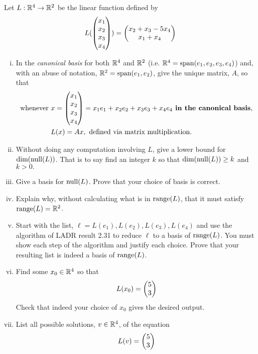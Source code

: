 \begin{question}
    \normalfont
    Let $L:\mathbb R^4\rightarrow\mathbb R^2$ be the linear function defined by
    \begin{equation}
        L(\begin{pmatrix} x_1\\ x_2\\x_3 \\ x_4\end{pmatrix})=\begin{pmatrix} x_2+x_3-5x_4\\ x_1+x_4\end{pmatrix}
    \end{equation}
    \begin{enumerate}[(i)]
        \item In the \textit{canonical basis} for both $\mathbb R^4$ and $\mathbb R^2$ (i.e. $\mathbb R^4=\textnormal{span}({e_1,e_2,e_3,e_4})$) and, with an abuse of notation, $\mathbb R^2=\textnormal{span}({e_1,e_2})$, give the unique matrix, $A$, so that 
        \[
            \begin{aligned}
                \text{whenever }&x=\begin{pmatrix} x_1\\ x_2\\x_3 \\ x_4\end{pmatrix}=x_1e_1+x_2e_2+x_3e_3+x_4e_4\textbf{ in the canonical basis},\\
                &L(x)=Ax,\text{ defined via matrix multiplication.}
            \end{aligned}
        \]
        \item Without doing any computation involving $L$, give a lower bound for $\textnormal{dim}(\textnormal{null}(L))$. That is to say find an integer $k$ so that $\textnormal{dim}(\textnormal{null}(L))\geq k$ and $k>0.$
        \item Give a basis for $\textnormal{null}(L)$. Prove that your choice of basis is correct.
        \item Explain why, without calculating what is in $\textnormal{range}(L)$, that it must satisfy $\textnormal{range}(L)=\mathbb R^2$.
        \item Start with the list, $\ell={L(e_1),L(e_2),L(e_3),L(e_4)}$ and use the algorithm of LADR result 2.31 to reduce $\ell$ to a basis of $\textnormal{range}(L)$. You must show each step of the algorithm and justify each choice. Prove that your resulting list is indeed a basis of $\textnormal{range}(L)$.
        \item Find some $x_0\in\mathbb R^4$ so that 
        \[
            \begin{aligned}
                L(x_0)=\begin{pmatrix} 5\\ 3\end{pmatrix}
            \end{aligned}
        \]
        Check that indeed your choice of $x_0$ gives the desired output.
        \item List all possible solutions, $v\in\mathbb R^4$, of the equation 
        \[
            \begin{aligned}
                L(v)=\begin{pmatrix} 5\\ 3\end{pmatrix}
            \end{aligned}
        \]
    \end{enumerate}
\end{question}

